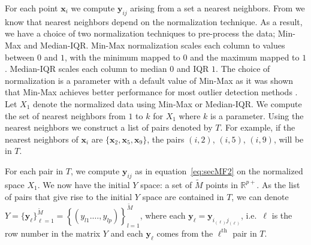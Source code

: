 \documentclass[letter,12pt]{article}
\begin{document}
For each point $\bm{x}_i$ we compute $\bm{y}_{ij}$ arising from a set a nearest neighbors. From \cite{kandanaarachchi2018normalization} we know that nearest neighbors depend on the normalization technique. As a result, we {\color{blue} have a choice of} two normalization techniques to pre-process the data; Min-Max and Median-IQR. Min-Max normalization scales each column to values between $0$ and $1$, with the minimum mapped to $0$ and the maximum mapped to $1$. Median-IQR scales each column to median $0$ and IQR $1$. %
{\color{blue} The choice of normalization is a parameter with a default value of Min-Max as it was shown that Min-Max achieves better performance for most outlier detection methods \citep{kandanaarachchi2018normalization}. Let $X_1$ denote the normalized data using Min-Max or Median-IQR. We compute the set of nearest neighbors from $1$ to $k$ for $X_1$ where $k$ is a parameter.
}
Using the nearest neighbors we construct a list of pairs denoted by $T$. {\color{blue} For example, if the nearest neighbors of $\bm{x}_i$  are $\{\bm{x}_2, \bm{x}_5, \bm{x}_9 \}$,   the pairs $(i, 2)$, $(i, 5)$, $(i, 9)$, will be in $T$. }

For each pair in $T$, we compute $\bm{y}_{ij}$ as in equation~\eqref{eq:secMF2} on the normalized space $X_1$. We now have the initial $Y$ space: a set of $\tilde{M}$ points in $\mathbb{R}^{p+}$. As the list of pairs that give rise to the initial $Y$ space are contained in $T$, we can denote $Y = \{ \bm{y}_\ell \}_{\ell=1}^{\tilde{M}} = \left\{ \left(y_{l1}. \ldots, y_{lp} \right) \right\}_{l=1}^{\tilde{M}}$, where each $\bm{y}_\ell = \bm{y}_{i_{(\ell)} j_{(\ell)} }$, i.e.\ $\ell$ is the row number in the matrix $Y$ and each $\bm{y}_\ell$ comes from the $\ell^{\text{th}}$ pair in $T$.
\end{document}
